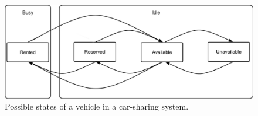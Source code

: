 \begin{figure}[tbh]
\centering
\includegraphics[width=1\textwidth]{imagens/diagrama_v4.pdf}
\caption{Possible states of a vehicle in a car-sharing system.}
\label{fig:diagrama}
\end{figure}